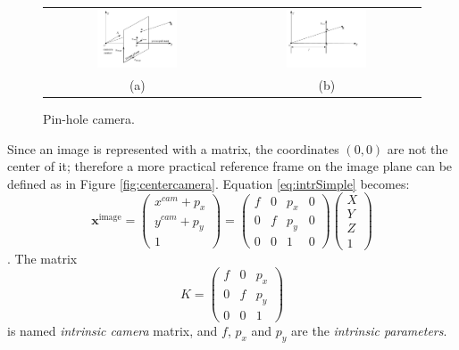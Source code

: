 \begin{figure}[t]
\centering
 \begin{tabular}{cc}
  \includegraphics[width=0.45\textwidth]{./img/ch-camera/camera}&
  \includegraphics[width=0.45\textwidth]{./img/ch-camera/camera01}\\
  (a)&(b)
 \end{tabular}
 \caption{Pin-hole camera.}
 \label{fig:pinhole}
\end{figure}
Since an image is represented with a matrix, the coordinates $(0,0)$ are not the center of it; therefore a more practical reference frame on the image plane can be defined as in Figure \ref{fig:centercamera}. Equation \eqref{eq:intrSimple} becomes:
\begin{equation}
\label{eq:intrCompl}
 \mathbf{x}^{\text{image}} = 
 \begin{pmatrix}
 x^{cam} + p_x\\
 y^{cam} + p_y\\
 1
 \end{pmatrix} =
 \begin{pmatrix}
 f&0&p_x&0\\
 0&f&p_y&0\\
 0&0&1&0
 \end{pmatrix} 
 \begin{pmatrix}
 X\\
 Y\\
 Z\\
 1
 \end{pmatrix}
\end{equation}.
The matrix 
\begin{equation}
\label{eq:kmatr}
K = 
\begin{pmatrix}
 f&0&p_x\\
 0&f&p_y\\
 0&0&1
 \end{pmatrix} 
\end{equation}
is named \emph{intrinsic camera} matrix, and $f$, $p_x$ and $p_y$ are the \emph{intrinsic parameters}. 

